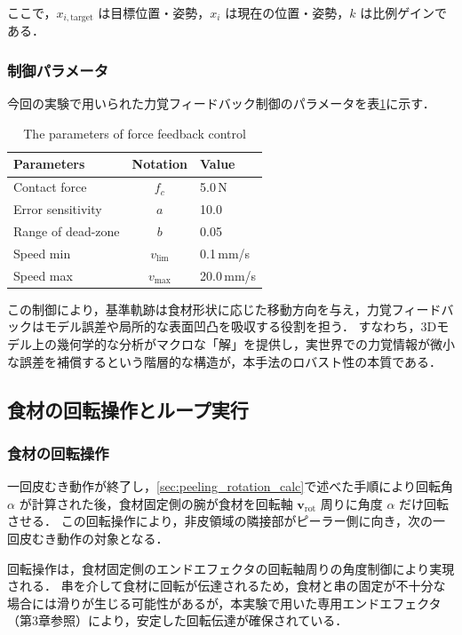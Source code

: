 ここで，$x_{i,\mathrm{target}}$ は目標位置・姿勢，$x_i$ は現在の位置・姿勢，$k$ は比例ゲインである．

\subsubsection{制御パラメータ}

今回の実験で用いられた力覚フィードバック制御のパラメータを表\ref{tab:peeling_force_params}に示す．

\begin{table}[ht]
  \centering
  \caption{The parameters of force feedback control}
  \label{tab:peeling_force_params}
  \begin{tabular}{@{}lcl@{}}
    \toprule
    Parameters & Notation & Value \\
    \midrule
    Contact force & $f_c$ & 5.0\,N \\
    Error sensitivity & $a$ & 10.0 \\
    Range of dead-zone & $b$ & 0.05 \\
    Speed min & $v_{\mathrm{lim}}$ & 0.1\,mm/s \\
    Speed max & $v_{\mathrm{max}}$ & 20.0\,mm/s \\
    \bottomrule
  \end{tabular}
\end{table}

この制御により，基準軌跡は食材形状に応じた移動方向を与え，力覚フィードバックはモデル誤差や局所的な表面凹凸を吸収する役割を担う．
すなわち，3Dモデル上の幾何学的な分析がマクロな「解」を提供し，実世界での力覚情報が微小な誤差を補償するという階層的な構造が，本手法のロバスト性の本質である．

\subsection{食材の回転操作とループ実行}
\label{sec:peeling_loop_peel_motion}

\subsubsection{食材の回転操作}

一回皮むき動作が終了し，\ref{sec:peeling_rotation_calc}で述べた手順により回転角 $\alpha$ が計算された後，食材固定側の腕が食材を回転軸 $\mathbf{v}_{\mathrm{rot}}$ 周りに角度 $\alpha$ だけ回転させる．
この回転操作により，非皮領域の隣接部がピーラー側に向き，次の一回皮むき動作の対象となる．

回転操作は，食材固定側のエンドエフェクタの回転軸周りの角度制御により実現される．
串を介して食材に回転が伝達されるため，食材と串の固定が不十分な場合には滑りが生じる可能性があるが，本実験で用いた専用エンドエフェクタ（第3章参照）により，安定した回転伝達が確保されている．

